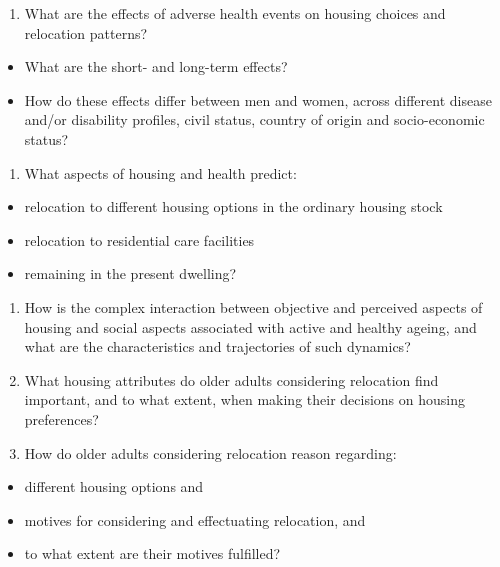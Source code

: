 \documentclass[
]{book}
\providecommand{\tightlist}{%
  \setlength{\itemsep}{0pt}\setlength{\parskip}{0pt}}
\begin{document}
\begin{enumerate}
\def\labelenumi{\arabic{enumi}.}
\setcounter{enumi}{2}
\tightlist
\item
  What are the effects of adverse health events on housing choices and relocation patterns?
\end{enumerate}

\begin{itemize}
\tightlist
\item
  What are the short- and long-term effects?
\item
  How do these effects differ between men and women, across different disease and/or disability profiles, civil status, country of origin and socio-economic status?
\end{itemize}

\begin{enumerate}
\def\labelenumi{\arabic{enumi}.}
\setcounter{enumi}{3}
\tightlist
\item
  What aspects of housing and health predict:
\end{enumerate}

\begin{itemize}
\tightlist
\item
  relocation to different housing options in the ordinary housing stock
\item
  relocation to residential care facilities
\item
  remaining in the present dwelling?
\end{itemize}

\begin{enumerate}
\def\labelenumi{\arabic{enumi}.}
\setcounter{enumi}{4}
\tightlist
\item
  How is the complex interaction between objective and perceived aspects of housing and social aspects associated with active and healthy ageing, and what are the characteristics and trajectories of such dynamics?
\item
  What housing attributes do older adults considering relocation find important, and to what extent, when making their decisions on housing preferences?
\item
  How do older adults considering relocation reason regarding:
\end{enumerate}

\begin{itemize}
\tightlist
\item
  different housing options and
\item
  motives for considering and effectuating relocation, and
\item
  to what extent are their motives fulfilled?
\end{itemize}
\end{document}
